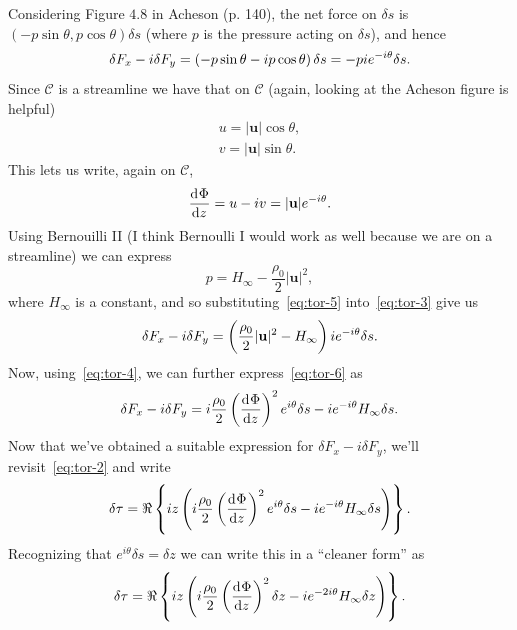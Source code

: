 \documentclass{article}
\def\*#1{\mathbf{#1}}
\newcommand{\fC}{\mathcal{C}} %
\newcommand{\dF}{\delta F}
\newcommand{\ds}{\delta s}
\newcommand{\dz}{\delta z}
\newcommand{\dtau}{\delta \tau}
\begin{document}
Considering Figure $4.8$ in Acheson (p. 140), the net force on $\ds$ is
$(-p \sin \theta, p \cos \theta) \ds$ (where $p$ is the pressure acting
on $\ds$), and hence
%
\begin{equation}
    \dF_x - i \dF_y
        = \del{-p \sin \theta - i p \cos \theta} \ds = -p i e^{-i \theta} \ds
    \label{eq:tor-3}
    .
\end{equation}
%
Since $\fC$ is a streamline we have that on $\fC$ (again, looking at the
Acheson figure is helpful)
%
\begin{align*}
    u = |\*u| \cos \theta, \\
    v = |\*u| \sin \theta.
\end{align*}
%
This lets us write, again on $\fC$,
%
\begin{equation}
    \dod{\Phi}{z} = u - i v = |\*u| e^{-i \theta}
    \label{eq:tor-4}
    .
\end{equation}
%
Using Bernouilli II (I think Bernoulli I would work as well because we
are on a streamline) we can express
%
\begin{equation}
    p = H_\infty - \frac{\rho_0}{2} |\*u|^2
    \label{eq:tor-5}
    ,
\end{equation}
%
where $H_\infty$ is a constant, and so substituting~\eqref{eq:tor-5}
into~\eqref{eq:tor-3} give us
%
\begin{equation}
    \dF_x - i \dF_y
        = \del{\frac{\rho_0}{2} |\*u|^2 - H_\infty} i e^{-i \theta} \ds
    \label{eq:tor-6}
        .
\end{equation}
%
Now, using~\eqref{eq:tor-4}, we can further express~\eqref{eq:tor-6} as
%
\begin{equation}
    \dF_x - i \dF_y
        = i \frac{\rho_0}{2} \del{\dod{\Phi}{z}}^2 e^{i \theta} \ds - i e^{- i \theta} H_\infty \ds
    \label{eq:tor-7}
        .
\end{equation}
%
Now that we've obtained a suitable expression for $\dF_x - i \dF_y$,
we'll revisit~\eqref{eq:tor-2} and write
%
\begin{equation*}
    \dtau = \Re \cbr{
        i z \del{i \frac{\rho_0}{2} \del{\dod{\Phi}{z}}^2 e^{i \theta} \ds
        - i e^{- i \theta} H_\infty \ds}
    }
    .
\end{equation*}
%
Recognizing that $e^{i \theta} \ds = \dz$ we can write this in a ``cleaner form'' as
%
\begin{equation*}
    \dtau = \Re \cbr{
        i z \del{i \frac{\rho_0}{2} \del{\dod{\Phi}{z}}^2 \dz
        - i e^{- 2 i \theta} H_\infty \dz}
    }
    .
\end{equation*}
\end{document}
